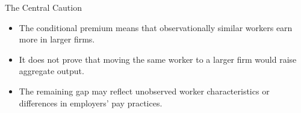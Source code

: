 \begin{frame}{The Central Caution}

  \vspace{0.35cm}
  \begin{itemize}
    \item The conditional premium means that observationally similar workers earn more in larger firms.
    \item It does not prove that moving the same worker to a larger firm would raise aggregate output.
    \item The remaining gap may reflect unobserved worker characteristics or differences in employers' pay practices.
  \end{itemize}
\end{frame}
